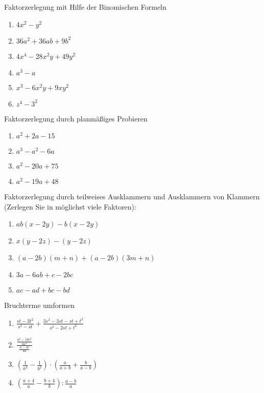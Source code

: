 Faktorzerlegung mit Hilfe der Binomischen Formeln

\begin{multicols}{2}
\begin{enumerate}[label=\alph*)]
\item $4x^2-y^2$
\item $36a^2 + 36ab + 9b^2$
\item $4x^4-28x^2y+49y^2$
\item $a^3-a$
\item $x^3-6x^2y+9xy^2$
  \item $z^4 -3^2$
\end{enumerate}
\end{multicols}

Faktorzerlegung durch planmäßiges Probieren

\begin{multicols}{2}
\begin{enumerate}[label=\alph*)]
\item $a^2 + 2a -15$
\item $a^3-a^2-6a$
\item $a^2 - 20a + 75$
  \item $a^2 -19a + 48$
\end{enumerate}
\end{multicols}

Faktorzerlegung durch teilweises Ausklammern und Ausklammern von
Klammern (Zerlegen Sie in möglichst viele Faktoren):

\begin{multicols}{2}
\begin{enumerate}[label=\alph*)]
\item $ab(x-2y)-b(x-2y)$
\item $x(y-2z)-(y-2z)$
\item $(a-2b)(m+n)+(a-2b)(3m+n)$
\item $3a-6ab+c-2bc$
  \item $ac-ad+bc-bd$
\end{enumerate}
\end{multicols}

Bruchterme umformen

\begin{multicols}{2}
\begin{enumerate}[label=\alph*)]
\item $\frac{st-3t^2}{s^2-st} + \frac{3s^2-3st-st+t^2}{s^2-2st+t^2}$
\item $\frac{\frac{a^2-16c^2}{8a^2}}{\frac{a-4c}{4a}}$
\item $\left(\frac{1}{a^2} - \frac{1}{b^2}\right) \cdot
    \left(\frac{a}{a+b} + \frac{b}{a-b}\right)$
\item $\left( \frac{a+4}{a} - \frac{b+4}{b}\right) : \frac{a-b}{a}$
    
\end{enumerate}
\end{multicols}


